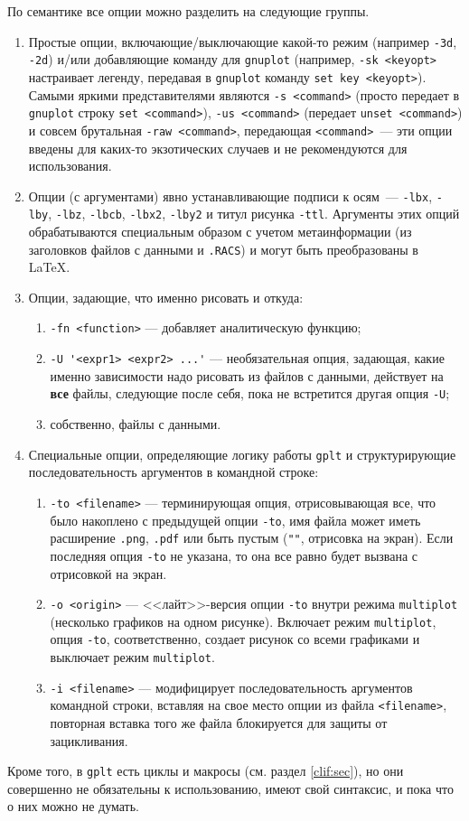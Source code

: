 \documentclass[12pt]{article}
\def\gplt{{\tt gplt}}
\def\gnuplot{{\tt gnuplot}}
\def\png{{\tt .png}}
\def\pdf{{\tt .pdf}}
\begin{document}
По семантике все опции можно разделить на следующие группы.
\begin{enumerate}
\item Простые опции, включающие/выключающие какой-то режим (например \verb'-3d', \verb'-2d')
  и/или добавляющие команду для \gnuplot{} (например, \verb'-sk <keyopt>' настраивает легенду, передавая в \gnuplot{} команду \verb'set key <keyopt>').
  Самыми яркими представителями являются \verb'-s <command>' (просто передает в \gnuplot{} строку \verb'set <command>'),
  \verb'-us <command>' (передает \verb'unset <command>') и совсем брутальная \verb'-raw <command>', передающая \verb'<command>'~---
  эти опции введены для каких-то экзотических случаев и не рекомендуются для использования. 
\item Опции (с аргументами) явно устанавливающие подписи к осям~--- \verb'-lbx', \verb'-lby', \verb'-lbz', \verb'-lbcb', \verb'-lbx2', \verb'-lby2'
  и титул рисунка \verb'-ttl'. Аргументы этих опций обрабатываются специальным образом с учетом метаинформации (из заголовков файлов с данными и \verb'.RACS') и
  могут быть преобразованы в \LaTeX{}.
\item Опции, задающие, что именно рисовать и откуда:
  \begin{enumerate}
  \item \verb'-fn <function>' --- добавляет аналитическую функцию;
  \item \verb|-U '<expr1> <expr2> ...'| --- необязательная опция, задающая, какие именно зависимости надо рисовать из файлов с данными, действует на {\bf все} файлы,
    следующие после себя, пока не встретится другая опция \verb'-U';
  \item собственно, файлы с данными. 
  \end{enumerate}
\item Специальные опции, определяющие логику работы \gplt{} и структурирующие последовательность аргументов в командной строке:
  \begin{enumerate}
  \item \verb'-to <filename>' --- терминирующая опция, отрисовывающая все, что было накоплено с предыдущей опции \verb'-to', имя файла может иметь расширение \png, \pdf{}
    или быть пустым (\verb|""|, отрисовка на экран). Если последняя опция \verb'-to' не указана, то она все равно будет вызвана с отрисовкой на экран.
  \item \verb'-o <origin>' --- <<лайт>>-версия опции \verb'-to' внутри режима \verb'multiplot' (несколько графиков на одном рисунке). Включает режим
    \verb'multiplot', опция \verb'-to', соответственно, создает рисунок со всеми графиками и выключает режим \verb'multiplot'.
  \item\verb'-i <filename>' --- модифицирует последовательность аргументов командной строки, вставляя на свое место опции из файла \verb'<filename>',
    повторная вставка того же файла блокируется для защиты от зацикливания.
  \end{enumerate}
\end{enumerate}
Кроме того, в \gplt{} есть циклы и макросы (см. раздел \ref{clif:sec}), но они совершенно не обязательны к использованию, имеют свой синтаксис, и пока что
о них можно не думать.
\end{document}
